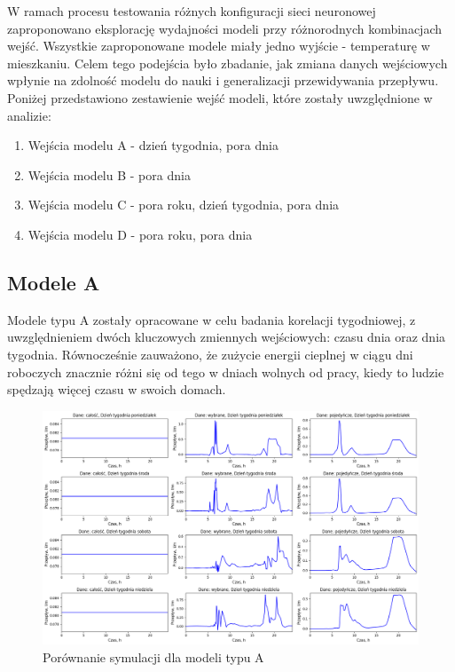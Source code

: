 \documentclass[a4paper,twoside,12pt]{book}
\begin{document}
W ramach procesu testowania różnych konfiguracji sieci neuronowej zaproponowano eksplorację wydajności modeli przy różnorodnych kombinacjach wejść. Wszystkie zaproponowane modele miały jedno wyjście - temperaturę w mieszkaniu. Celem tego podejścia było zbadanie, jak zmiana danych wejściowych wpłynie na zdolność modelu do nauki i generalizacji przewidywania przepływu. Poniżej przedstawiono zestawienie wejść modeli, które zostały uwzględnione w analizie:

\newpage
\begin{enumerate}
  \item Wejścia modelu A - dzień tygodnia, pora dnia
  \item Wejścia modelu B - pora dnia
  \item Wejścia modelu C - pora roku, dzień tygodnia, pora dnia
  \item Wejścia modelu D - pora roku, pora dnia
\end{enumerate}

\subsection*{Modele A}
Modele typu A zostały opracowane w celu badania korelacji tygodniowej, z uwzględnieniem dwóch kluczowych zmiennych wejściowych: czasu dnia oraz dnia tygodnia. Równocześnie zauważono, że zużycie energii cieplnej w ciągu dni roboczych znacznie różni się od tego w dniach wolnych od pracy, kiedy to ludzie spędzają więcej czasu w swoich domach.\\
\begin{figure}[!h]
  \centering
  \includegraphics[width=1\textwidth]{img/Model_A.png}
  \caption{Porównanie symulacji dla modeli typu A}
  \label{fig:etykieta-rysunku}
\end{figure}\\
\end{document}

